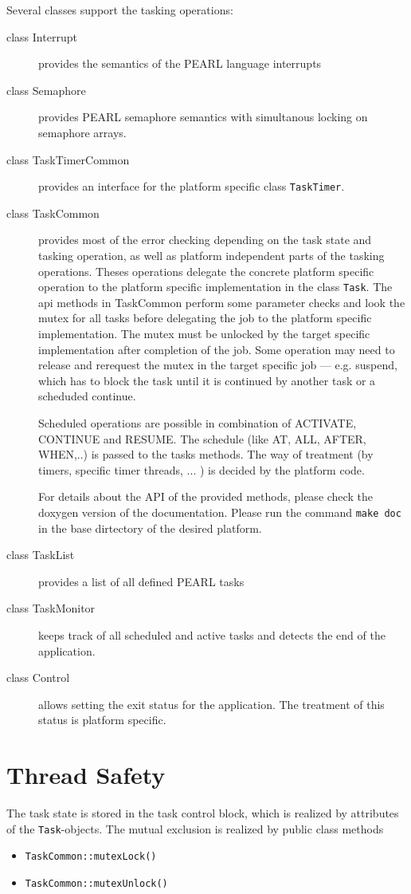 \begin{description}
Several classes support the tasking operations:
\begin{description}
\item[class Interrupt] provides the semantics of the PEARL language interrupts
\item[class Semaphore] provides PEARL semaphore semantics with simultanous
   locking on semaphore arrays.
\item[class TaskTimerCommon] provides an interface for the platform
   specific class \verb|TaskTimer|. 
\item[class TaskCommon] provides most of the error checking depending on
   the task state and tasking operation, as well as platform independent
   parts of the tasking operations. Theses operations delegate the concrete
   platform specific operation to the platform specific implementation
   in the class \verb|Task|. The api methods in TaskCommon perform some
    parameter checks and look the mutex for all tasks before delegating 
    the job to the platform specific implementation. 
    The mutex must be unlocked by the target specific implementation 
    after completion of the job. Some operation may need to release and 
    rerequest the mutex in the target specific job --- e.g. suspend,
    which has to block the task until it is continued by another task
    or a scheduded continue.

   Scheduled operations are possible in combination of ACTIVATE, 
   CONTINUE and RESUME.
   The schedule (like AT, ALL, AFTER, WHEN,..) is passed to the 
   tasks methods. The way of treatment (by timers, specific timer threads, ... )
   is decided by the platform code.

   For details about the API of the provided methods, please check the doxygen 
   version of the documentation.
   Please run  the command \verb|make doc| in the base dirtectory of the
   desired platform.

\item[class TaskList] provides a list of all defined PEARL tasks
\item[class TaskMonitor] keeps track of all scheduled and active tasks and
   detects the end of the application.
\item[class Control] allows setting the exit status for the application. 
  The treatment of this status is platform specific.
\end{description}

\section{Thread Safety}
The task state is stored in the task control block, which is realized
by attributes of the \verb|Task|-objects.
The mutual exclusion is realized by  public class methods
\begin{itemize}
\item \verb|TaskCommon::mutexLock()|
\item \verb|TaskCommon::mutexUnlock()|
\end{itemize}
 

\end{description}
